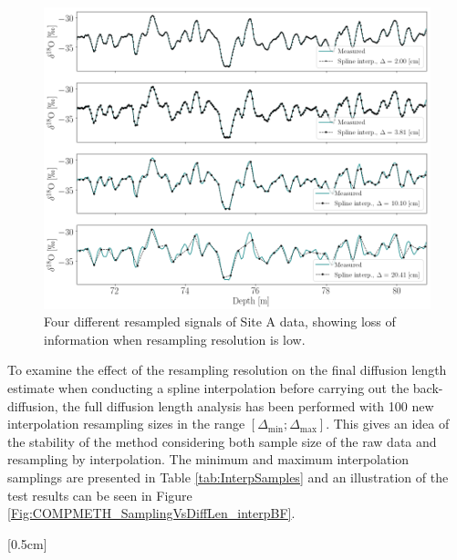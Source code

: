 \documentclass[../../CompleteThesis2/Complete_2ndDraft]{subfiles}
\begin{document}
\begin{figure}[h]
	\centering
	\includegraphics[width=\textwidth]{SiteA_MultiSplineInterp.png}
	\caption[Different resamplings of Site A.]{\small Four different resampled signals of Site A data, showing loss of information when resampling resolution is low.}
	\label{Fig:COMPMETH_SiteA_MultiSplineInterp}
\end{figure}

To examine the effect of the resampling resolution on the final diffusion length estimate when conducting a spline interpolation before carrying out the back-diffusion, the full diffusion length analysis has been performed with 100 new interpolation resampling sizes in the range $[\Delta_{\text{min}};\Delta_{\text{max}}]$. This gives an idea of the stability of the method considering both sample size of the raw data and resampling by interpolation. The minimum and maximum interpolation samplings are presented in Table \ref{tab:InterpSamples} and an illustration of the test results can be seen in Figure \ref{Fig:COMPMETH_SamplingVsDiffLen_interpBF}.

[0.5cm]%
\end{document}
